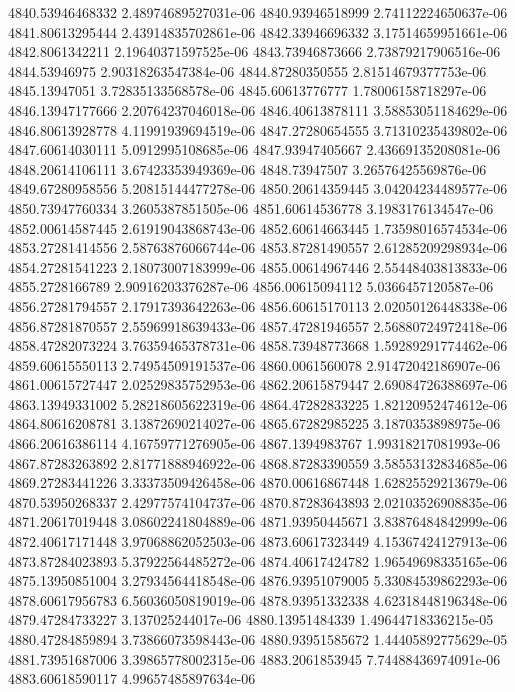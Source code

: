 {4840.53946468332 2.48974689527031e-06
4840.93946518999 2.74112224650637e-06
4841.80613295444 2.43914835702861e-06
4842.33946696332 3.17514659951661e-06
4842.8061342211 2.19640371597525e-06
4843.73946873666 2.73879217906516e-06
4844.53946975 2.90318263547384e-06
4844.87280350555 2.81514679377753e-06
4845.13947051 3.72835133568578e-06
4845.60613776777 1.78006158718297e-06
4846.13947177666 2.20764237046018e-06
4846.40613878111 3.58853051184629e-06
4846.80613928778 4.11991939694519e-06
4847.27280654555 3.71310235439802e-06
4847.60614030111 5.0912995108685e-06
4847.93947405667 2.43669135208081e-06
4848.20614106111 3.67423353949369e-06
4848.73947507 3.26576425569876e-06
4849.67280958556 5.20815144477278e-06
4850.20614359445 3.04204234489577e-06
4850.73947760334 3.2605387851505e-06
4851.60614536778 3.1983176134547e-06
4852.00614587445 2.61919043868743e-06
4852.60614663445 1.73598016574534e-06
4853.27281414556 2.58763876066744e-06
4853.87281490557 2.61285209298934e-06
4854.27281541223 2.18073007183999e-06
4855.00614967446 2.55448403813833e-06
4855.2728166789 2.90916203376287e-06
4856.00615094112 5.0366457120587e-06
4856.27281794557 2.17917393642263e-06
4856.60615170113 2.02050126448338e-06
4856.87281870557 2.55969918639433e-06
4857.47281946557 2.56880724972418e-06
4858.47282073224 3.76359465378731e-06
4858.73948773668 1.59289291774462e-06
4859.60615550113 2.74954509191537e-06
4860.0061560078 2.91472042186907e-06
4861.00615727447 2.02529835752953e-06
4862.20615879447 2.69084726388697e-06
4863.13949331002 5.28218605622319e-06
4864.47282833225 1.82120952474612e-06
4864.80616208781 3.13872690214027e-06
4865.67282985225 3.1870353898975e-06
4866.20616386114 4.16759771276905e-06
4867.1394983767 1.99318217081993e-06
4867.87283263892 2.81771888946922e-06
4868.87283390559 3.58553132834685e-06
4869.27283441226 3.33373509426458e-06
4870.00616867448 1.62825529213679e-06
4870.53950268337 2.42977574104737e-06
4870.87283643893 2.02103526908835e-06
4871.20617019448 3.08602241804889e-06
4871.93950445671 3.83876484842999e-06
4872.40617171448 3.97068862052503e-06
4873.60617323449 4.15367424127913e-06
4873.87284023893 5.37922564485272e-06
4874.40617424782 1.96549698335165e-06
4875.13950851004 3.27934564418548e-06
4876.93951079005 5.33084539862293e-06
4878.60617956783 6.56036050819019e-06
4878.93951332338 4.62318448196348e-06
4879.47284733227 3.137025244017e-06
4880.13951484339 1.49644718336215e-05
4880.47284859894 3.73866073598443e-06
4880.93951585672 1.44405892775629e-05
4881.73951687006 3.39865778002315e-06
4883.2061853945 7.74488436974091e-06
4883.60618590117 4.99657485897634e-06
}
